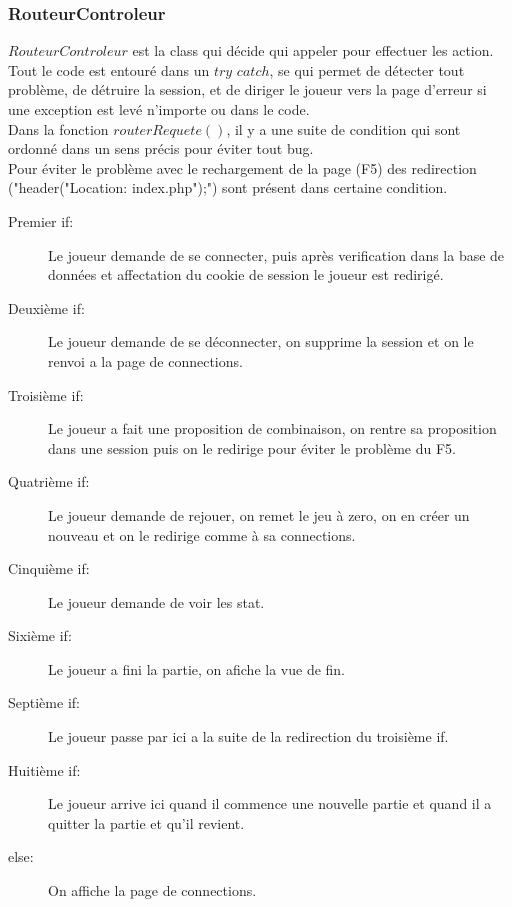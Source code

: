 \documentclass{article}
\begin{document}
        \subsubsection{RouteurControleur}\label{RouteurControleur}
        $RouteurControleur$ est la class qui décide qui appeler pour effectuer les action.\\
        Tout le code est entouré dans un $try$ $catch$, se qui permet de détecter tout problème, de détruire la session, et de diriger le joueur vers la page d'erreur si une exception est levé n'importe ou dans le code.\\
        Dans la fonction $routerRequete()$, il y a une suite de condition qui sont ordonné dans un sens précis pour éviter tout bug.\\
        Pour éviter le problème avec le rechargement de la page (F5) des redirection ("header("Location: index.php");") sont présent dans certaine condition.
        \begin{description}
            \item[Premier if:] Le joueur demande de se connecter, puis après verification dans la base de données et affectation du cookie de session le joueur est redirigé.
            \item[Deuxième if:] Le joueur demande de se déconnecter, on supprime la session et on le renvoi a la page de connections.
            \item[Troisième if:] Le joueur a fait une proposition de combinaison, on rentre sa proposition dans une session puis on le redirige pour éviter le problème du F5.
            \item[Quatrième if:] Le joueur demande de rejouer, on remet le jeu à zero, on en créer un nouveau et on le redirige comme à sa connections.
            \item[Cinquième if:] Le joueur demande de voir les stat.
            \item[Sixième if:] Le joueur a fini la partie, on afiche la vue de fin.
            \item[Septième if:] Le joueur passe par ici a la suite de la redirection du troisième if.
            \item[Huitième if:] Le joueur arrive ici quand il commence une nouvelle partie et quand il a quitter la partie et qu'il revient.
            \item[else:] On affiche la page de connections.
        \end{description}
        
\end{document}
